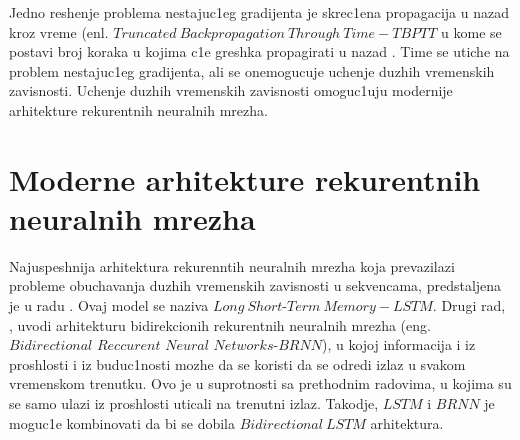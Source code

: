 \documentclass[a4paper, openany, oneside, 11pt]{book}
\begin{document}
Jedno reshenje problema nestajuc1eg gradijenta je skrec1ena propagacija u nazad kroz vreme (enl. $Truncated\ Backpropagation\ Through\ Time-TBPTT$ u kome se postavi broj koraka u kojima c1e greshka propagirati u nazad \cite{TBPTT}. Time se utiche na problem nestajuc1eg gradijenta, ali se onemogucuje uchenje duzhih vremenskih zavisnosti. Uchenje duzhih vremenskih zavisnosti omoguc1uju modernije arhitekture rekurentnih neuralnih mrezha.
\section{Moderne arhitekture rekurentnih neuralnih mrezha}
Najuspeshnija arhitektura rekurenntih neuralnih mrezha koja prevazilazi probleme obuchavanja duzhih vremenskih zavisnosti u sekvencama, predstaljena je u radu \cite{LSTM}. Ovaj model se naziva $Long\ Short$-$Term\ Memory - LSTM$. Drugi rad, \cite{BLSTM}, uvodi arhitekturu bidirekcionih rekurentnih neuralnih mrezha (eng. $Bidirectional$ $Reccurent$ $Neural$ $Networks$-$BRNN$), u kojoj informacija i iz proshlosti i iz buduc1nosti mozhe da se koristi da se odredi izlaz u svakom vremenskom trenutku. Ovo je u suprotnosti sa prethodnim radovima, u kojima su se samo ulazi iz proshlosti uticali na trenutni izlaz. Takodje, $LSTM$ i $BRNN$ je moguc1e kombinovati da bi se dobila $Bidirectional\ LSTM$ arhitektura.
\end{document}
